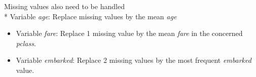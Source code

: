 \documentclass[12,]{article}
\newenvironment{Shaded}{\begin{snugshade}}{\end{snugshade}}
\newcommand{\KeywordTok}[1]{\textcolor[rgb]{0.13,0.29,0.53}{\textbf{{#1}}}}
\newcommand{\DataTypeTok}[1]{\textcolor[rgb]{0.13,0.29,0.53}{{#1}}}
\newcommand{\StringTok}[1]{\textcolor[rgb]{0.31,0.60,0.02}{{#1}}}
\newcommand{\OtherTok}[1]{\textcolor[rgb]{0.56,0.35,0.01}{{#1}}}
\newcommand{\NormalTok}[1]{{#1}}
\providecommand{\tightlist}{%
  \setlength{\itemsep}{0pt}\setlength{\parskip}{0pt}}
\begin{document}
\begin{Shaded}
\end{Shaded}

Missing values also need to be handled\\
* Variable \emph{age}: Replace missing values by the mean \emph{age}

\begin{Shaded}
\end{Shaded}

\begin{itemize}
\tightlist
\item
  Variable \emph{fare}: Replace 1 missing value by the mean \emph{fare}
  in the concerned \emph{pclass}.
\end{itemize}

\begin{Shaded}
\end{Shaded}

\begin{itemize}
\tightlist
\item
  Variable \emph{embarked}: Replace 2 missing values by the most
  frequent \emph{embarked} value.
\end{itemize}

\begin{Shaded}
\end{Shaded}
\end{document}
